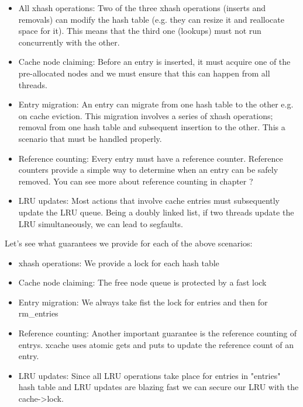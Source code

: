 \begin{itemize}
	\item
		All xhash operations: Two of the three xhash operations (inserts 
		and removals) can modify the hash table (e.g. they can resize it 
		and reallocate space for it). This means that the third one 
		(lookups) must not run concurrently with the other.
	\item
		Cache node claiming: Before an entry is inserted, it must	
		acquire one of the pre-allocated nodes and we must ensure that 
		this can happen from all threads.
	\item
		Entry migration: An entry can migrate from one hash table to 
		the other e.g. on cache eviction. This migration involves a 
		series of xhash operations; removal from one hash table and 
		subsequent insertion to the other. This a scenario that must be 
		handled properly.
	\item
		Reference counting: Every entry must have a reference counter.  
		Reference counters provide a simple way to determine when an 
		entry can be safely removed. You can see more about reference 
		counting in chapter ?
	\item
		LRU updates: Most actions that involve cache entries must 
		subsequently update the LRU queue. Being a doubly linked list, 
		if two threads update the LRU simultaneously, we can lead to 
		segfaults.
\end{itemize}

Let's see what guarantees we provide for each of the above scenarios:

\begin{itemize}
	\item
		xhash operations: We provide a lock for each hash table
	\item
		Cache node claiming: The free node queue is protected by a fast 
		lock
	\item
		Entry migration: We always take fist the lock for entries and 
		then for rm\_entries
	\item
		Reference counting: Another important guarantee is the 
		reference counting of entrys. xcache uses atomic gets and puts 
		to update the reference count of an entry.
	\item
		LRU updates: Since all LRU operations take place for entries in 
		"entries" hash table and LRU updates are blazing fast we can 
		secure our LRU with the cache->lock.
\end{itemize}



